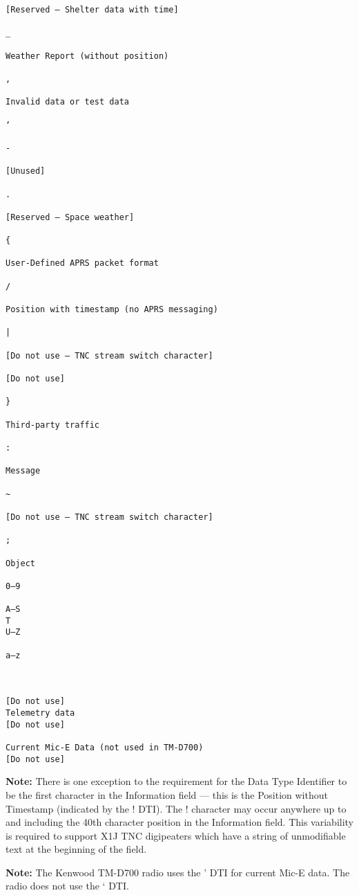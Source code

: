 \begin{verbatim}
[Reserved — Shelter data with time]

_

Weather Report (without position)

,

Invalid data or test data

‘

-

[Unused]

.

[Reserved — Space weather]

{

User-Defined APRS packet format

/

Position with timestamp (no APRS messaging)

|

[Do not use — TNC stream switch character]

[Do not use]

}

Third-party traffic

:

Message

~

[Do not use — TNC stream switch character]

;

Object

0–9

A–S
T
U–Z

a–z



[Do not use]
Telemetry data
[Do not use]

Current Mic-E Data (not used in TM-D700)
[Do not use]

\end{verbatim}





\textbf{Note:} There is one exception to the requirement for the Data Type Identifier
to be the first character in the Information field — this is the Position without
Timestamp (indicated by the ! DTI). The ! character may occur anywhere
up to and including the 40th character position in the Information field. This
variability is required to support X1J TNC digipeaters which have a string of
unmodifiable text at the beginning of the field.


\textbf{Note:} The Kenwood TM-D700 radio uses the ' DTI for current Mic-E data.
The radio does not use the ‘ DTI.

